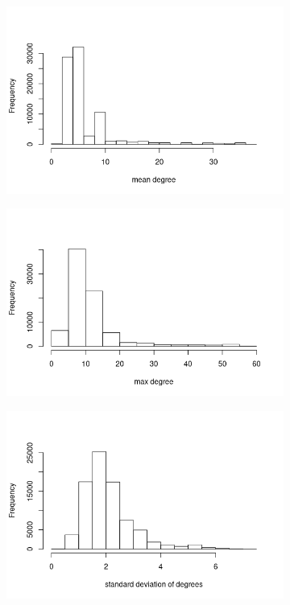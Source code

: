 \documentclass{article}
\theoremstyle{definition}
\theoremstyle{remark}
\begin{document}
\begin{figure}
\begin{subfigure}[t]{0.49\textwidth}
    \includegraphics[width=\textwidth]{mcs_meandeg.png}
  \end{subfigure}
  \begin{subfigure}[t]{0.49\textwidth}
    \centering
    \includegraphics[width=\textwidth]{mcs_maxdeg.png}
  \end{subfigure}
  \begin{subfigure}[t]{0.49\textwidth}
    \centering
    \includegraphics[width=\textwidth]{mcs_stddeg.png}

\end{subfigure}
\end{figure}
\end{document}
